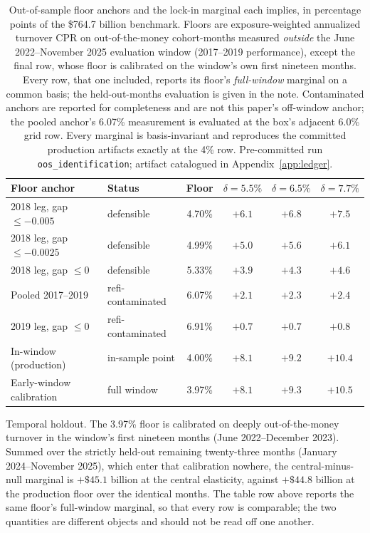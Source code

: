 \documentclass[12pt]{article}
\begin{document}
\begin{table}[H]
\centering
\footnotesize
\begin{threeparttable}
\caption{Out-of-sample floor anchors and the lock-in marginal each implies, in percentage points of the \$764.7 billion benchmark. Floors are exposure-weighted annualized turnover CPR on out-of-the-money cohort-months measured \emph{outside} the June 2022--November 2025 evaluation window (2017--2019 performance), except the final row, whose floor is calibrated on the window's own first nineteen months. Every row, that one included, reports its floor's \emph{full-window} marginal on a common basis; the held-out-months evaluation is given in the note. Contaminated anchors are reported for completeness and are not this paper's off-window anchor; the pooled anchor's 6.07\% measurement is evaluated at the box's adjacent 6.0\% grid row. Every marginal is basis-invariant and reproduces the committed production artifacts exactly at the 4\% row. Pre-committed run \texttt{oos\_identification}; artifact catalogued in Appendix~\ref{app:ledger}.}
\label{tab:oosfloor}
\begin{tabular}{llcccc}
\toprule
Floor anchor & Status & Floor & $\delta = 5.5\%$ & $\delta = 6.5\%$ & $\delta = 7.7\%$ \\
\midrule
2018 leg, gap $\leq -0.005$ & defensible & 4.70\% & $+6.1$ & $+6.8$ & $+7.5$ \\
2018 leg, gap $\leq -0.0025$ & defensible & 4.99\% & $+5.0$ & $+5.6$ & $+6.1$ \\
2018 leg, gap $\leq 0$ & defensible & 5.33\% & $+3.9$ & $+4.3$ & $+4.6$ \\
\midrule
Pooled 2017--2019 & refi-contaminated & 6.07\% & $+2.1$ & $+2.3$ & $+2.4$ \\
2019 leg, gap $\leq 0$ & refi-contaminated & 6.91\% & $+0.7$ & $+0.7$ & $+0.8$ \\
\midrule
In-window (production) & in-sample point & 4.00\% & $+8.1$ & $+9.2$ & $+10.4$ \\
Early-window calibration & full window\tnote{a} & 3.97\% & $+8.1$ & $+9.3$ & $+10.5$ \\
\bottomrule
\end{tabular}
\begin{tablenotes}[flushleft]\footnotesize
\item[a] Temporal holdout. The 3.97\% floor is calibrated on deeply out-of-the-money turnover in the window's first nineteen months (June 2022--December 2023). Summed over the strictly held-out remaining twenty-three months (January 2024--November 2025), which enter that calibration nowhere, the central-minus-null marginal is $+\$45.1$ billion at the central elasticity, against $+\$44.8$ billion at the production floor over the identical months. The table row above reports the same floor's full-window marginal, so that every row is comparable; the two quantities are different objects and should not be read off one another.
\end{tablenotes}
\end{threeparttable}
\end{table}
\end{document}
